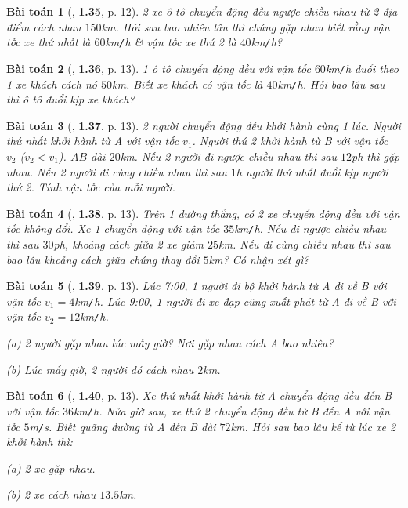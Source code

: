 \documentclass{article}
\numberwithin{equation}{section}
\newtheorem{baitoan}{Bài toán}[section]
\begin{document}
\begin{baitoan}[\cite{Van2022}, \textbf{1.35}, p. 12]
	2 xe ô tô chuyển động đều ngược chiều nhau từ 2 địa điểm cách nhau $150$\emph{km}. Hỏi sau bao nhiêu lâu thì chúng gặp nhau biết rằng vận tốc xe thứ nhất là $60$\emph{km\texttt{/}h} \& vận tốc xe thứ 2 là $40$\emph{km\texttt{/}h}?
\end{baitoan}

\begin{baitoan}[\cite{Van2022}, \textbf{1.36}, p. 13]
	1 ô tô chuyển động đều với vận tốc $60$\emph{km\texttt{/}h} đuổi theo 1 xe khách cách nó $50$\emph{km}. Biết xe khách có vận tốc là $40$\emph{km\texttt{/}h}. Hỏi bao lâu sau thì ô tô đuổi kịp xe khách?
\end{baitoan}

\begin{baitoan}[\cite{Van2022}, \textbf{1.37}, p. 13]
	2 người chuyển động đều khởi hành cùng 1 lúc. Người thứ nhất khởi hành từ A với vận tốc $v_1$. Người thứ 2 khởi hành từ B với vận tốc $v_2$ ($v_2 < v_1$). $AB$ dài $20$\emph{km}. Nếu 2 người đi ngược chiều nhau thì sau $12$\emph{ph} thì gặp nhau. Nếu 2 người đi cùng chiều nhau thì sau $1$\emph{h} người thứ nhất đuổi kịp người thứ 2. Tính vận tốc của mỗi người.
\end{baitoan}

\begin{baitoan}[\cite{Van2022}, \textbf{1.38}, p. 13]
	Trên 1 đường thẳng, có 2 xe chuyển động đều với vận tốc không đổi. Xe 1 chuyển động với vận tốc $35$\emph{km\texttt{/}h}. Nếu đi ngược chiều nhau thì sau $30$\emph{ph}, khoảng cách giữa 2 xe giảm $25$\emph{km}. Nếu đi cùng chiều nhau thì sau bao lâu khoảng cách giữa chúng thay đổi $5$\emph{km}? Có nhận xét gì?
\end{baitoan}

\begin{baitoan}[\cite{Van2022}, \textbf{1.39}, p. 13]
	Lúc 7:00, 1 người đi bộ khởi hành từ A đi về B với vận tốc $v_1 = 4$\emph{km\texttt{/}h}. Lúc 9:00, 1 người đi xe đạp cũng xuất phát từ A đi về B với vận tốc $v_2 = 12$\emph{km\texttt{/}h}.
	\begin{enumerate*}
		\item[(a)] 2 người gặp nhau lúc mấy giờ? Nơi gặp nhau cách A bao nhiêu?
		\item[(b)] Lúc mấy giờ, 2 người đó cách nhau $2$\emph{km}.
	\end{enumerate*}
\end{baitoan}

\begin{baitoan}[\cite{Van2022}, \textbf{1.40}, p. 13]
	Xe thứ nhất khởi hành từ A chuyển động đều đến B với vận tốc $36$\emph{km\texttt{/}h}. Nửa giờ sau, xe thứ 2 chuyển động đều từ B đến A với vận tốc $5$\emph{m\texttt{/}s}. Biết quãng đường từ A đến B dài $72$\emph{km}. Hỏi sau bao lâu kể từ lúc xe 2 khởi hành thì:
	\begin{enumerate*}
		\item[(a)] 2 xe gặp nhau.
		\item[(b)] 2 xe cách nhau $13.5$\emph{km}.
	\end{enumerate*}
\end{baitoan}
\end{document}
